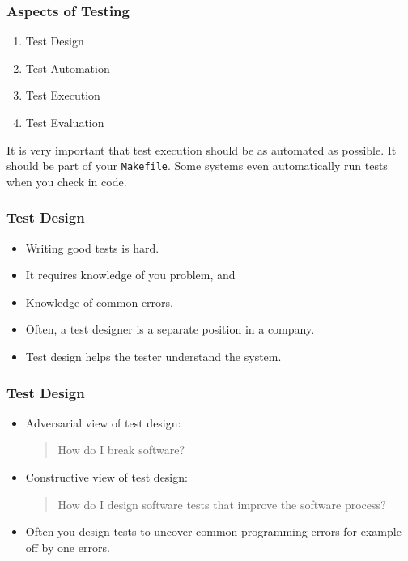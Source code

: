 \documentclass[handout]{beamer}
\begin{document}
\begin{frame}
  \frametitle{Aspects of Testing}
  \begin{enumerate}
  \item Test Design
  \item Test Automation
  \item Test Execution
  \item Test Evaluation
  \end{enumerate}
It is very important that test execution should be as automated as possible. It
should be part of your {\tt Makefile}. Some systems even automatically
run tests when you check in code.
\end{frame}
\begin{frame}
  \frametitle{Test Design}
  \begin{itemize}
  \item  Writing good tests is  hard. 
  \item It requires knowledge of you  problem, and 
  \item Knowledge of common errors.
  \item Often, a test designer is a separate  position in a company.
  \item Test design helps the tester understand the system.
  \end{itemize}
\end{frame}
\begin{frame}
  \frametitle{Test Design}
  
  \begin{itemize}
  \item Adversarial view of test design: 
    \begin{quote}
       How do I break software? \pause
    \end{quote}
  \item Constructive view of test design:
    \begin{quote}
       How do I design software tests that improve the software process?
     \end{quote}
   \item Often you design tests to uncover common programming errors
     for example off by one errors.
  \end{itemize}
\end{frame}
\end{document}
